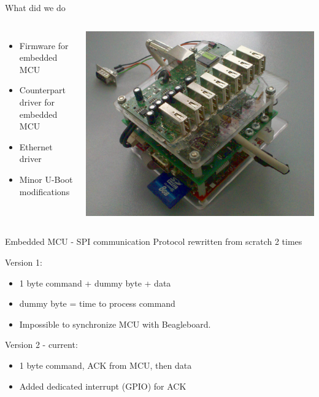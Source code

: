 \documentclass{beamer}
\begin{document}
\begin{frame}{What did we do}

\begin{columns}[c]

\begin{itemize}
	\item Firmware for embedded MCU
	\item Counterpart driver for embedded MCU 
	\item Ethernet driver
	\item Minor U-Boot modifications
\end{itemize}

\includegraphics[width=\textwidth]{../img/main}

\end{columns}
\end{frame}

\begin{frame}{Embedded MCU - SPI communication}
Protocol rewritten from scratch 2 times

Version 1:
\begin{itemize}
	\item 1 byte command + dummy byte + data
	\item dummy byte = time to process command
	\item Impossible to synchronize MCU with Beagleboard.
\end{itemize}

Version 2 - current:
\begin{itemize}
\item 1 byte command, ACK from MCU, then data
\item Added dedicated interrupt (GPIO) for ACK
\end{itemize}
\end{frame}
\end{document}
